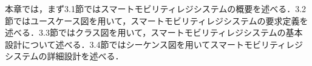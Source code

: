 

本章では，まず3.1節ではスマートモビリティレジシステムの概要を述べる．3.2節ではユースケース図を用いて，スマートモビリティレジシステムの要求定義を述べる．3.3節ではクラス図を用いて，スマートモビリティレジシステムの基本設計について述べる．3.4節ではシーケンス図を用いてスマートモビリティレジシステムの詳細設計を述べる．